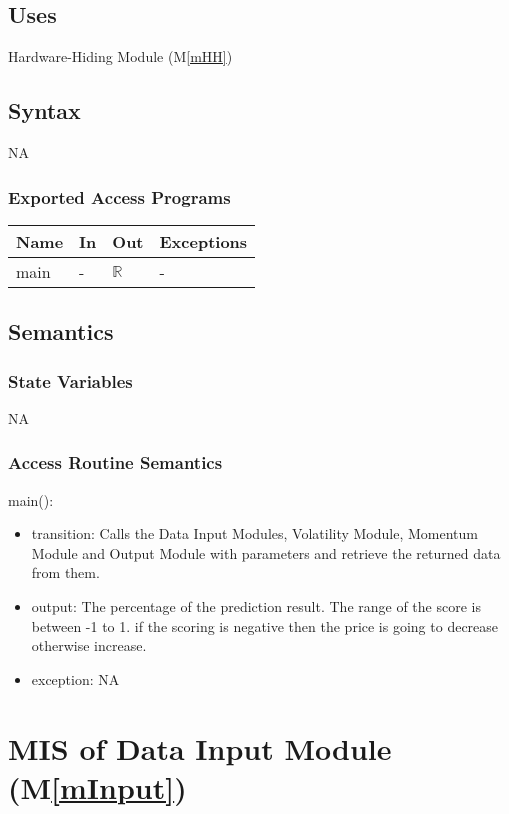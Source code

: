 \documentclass[12pt, titlepage]{article}
\newcommand{\mref}[1]{M\ref{#1}}
\begin{document}
\subsection{Uses}
Hardware-Hiding Module (\mref{mHH})

\subsection{Syntax}
NA
\subsubsection{Exported Access Programs}

\begin{center}
\begin{tabular}{p{2cm} p{4cm} p{4cm} p{2cm}}
\hline
\textbf{Name} & \textbf{In} & \textbf{Out} & \textbf{Exceptions} \\
\hline

main & - &$\mathbb{R}$ & - \\
\hline
\end{tabular}
\end{center}

\subsection{Semantics}
\subsubsection{State Variables}
NA
\subsubsection{Access Routine Semantics}

\noindent main():
\begin{itemize}
\item transition: Calls the Data Input Modules, Volatility Module, Momentum Module and Output Module with parameters and retrieve the returned data from them. 
\item output: The percentage of the prediction result. The range of the score is between -1 to 1. if the scoring is negative then the price is going to decrease otherwise increase. \\
\item exception: NA
\end{itemize}


\section{MIS of Data Input Module (\mref{mInput}) } 
\end{document}
